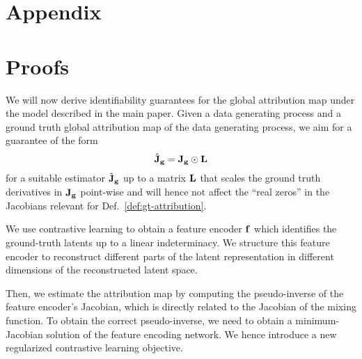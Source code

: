 \section*{\Large Appendix}

\section{Proofs}

    We will now derive identifiability guarantees for the global attribution map under the model described in the main paper. Given a data generating process and a ground truth global attribution map of the data generating process, we aim for a guarantee of the form
    \begin{equation}
        \hat{\mathbf{J}}_{\mathbf{g}}  = \mathbf{J}_{\mathbf{g}} \odot \mathbf{L}
    \end{equation}
    for a suitable estimator $\hat{\mathbf{J}}_{\mathbf{g}}$ up to a matrix $\mathbf{L}$ that scales the ground truth derivatives in $\mathbf{J}_{\mathbf{g}}$ point-wise and will hence not affect the ``real zeros'' in the Jacobians relevant for Def.~\ref{def:gt-attribution}.

    We use contrastive learning to obtain a feature encoder $\mathbf{f}$ which identifies the ground-truth latents up to a linear indeterminacy. We structure this feature encoder to reconstruct different parts of the latent representation in different dimensions of the reconstructed latent space.

    Then, we estimate the attribution map by computing the pseudo-inverse of the feature encoder's Jacobian, which is directly related to the Jacobian of the mixing function.
    To obtain the correct pseudo-inverse, we need to obtain a minimum-Jacobian solution of the feature encoding network. We hence introduce a new regularized contrastive learning objective. 

